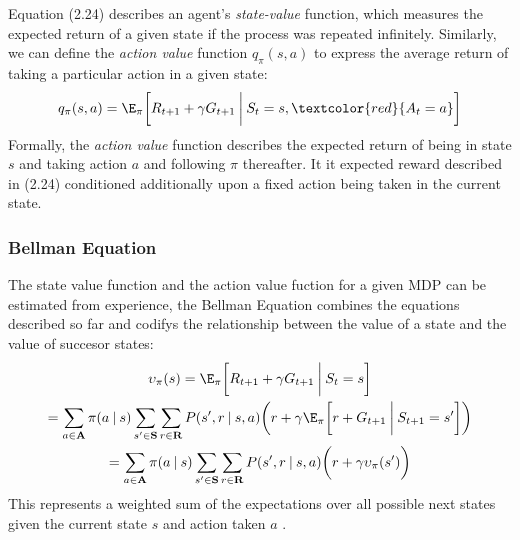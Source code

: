 Equation (2.24) describes an agent's \emph{state-value} function, which measures
the expected return of a given state if the process was repeated infinitely. Similarly,
we can define the \emph{action value} function $q_\pi(s,a)$ to express the average return
of taking a particular action in a given state:
\begin{equation}
    q_\pi(s,a) = \E_\pi \biggl [R_{t+1} + \gamma G_{t+1} \: \biggl | \: S_t = s,\textcolor{red}{ A_t = a} \biggl]
\end{equation}
Formally, the \emph{action value} function describes the expected return of being in state $s$ and taking
action $a$ and following $\pi$ thereafter. It it expected reward described in (2.24) conditioned
additionally upon a fixed action being taken in the current state.
\subsubsection{Bellman Equation}
The state value function and the action value fuction for a given MDP can be estimated from
experience, the Bellman Equation combines the equations described so far and codifys
the relationship between the value of a state and the value of succesor states:
\begin{equation}
    \begin{gathered}
        \upsilon_\pi(s) = \E_\pi \biggl[ R_{t+1} + \gamma G_{t+1}\: \biggl | \: S_t = s  \biggl ] \\
        = \sum_{a \in \mathbf{A}} \pi(a \: | \: s) \sum_{s' \in \mathbf{S}} \sum_{r\in \mathbf{R}}P(s',r \: | \: s,a) \biggl(r + \gamma \E_\pi \biggl [r + G_{t+1} \: \biggl | \: S_{t+1} = s' \biggl] \biggl)\\
        =\sum_{a \in \mathbf{A}} \pi(a \: | \: s) \sum_{s' \in \mathbf{S}} \sum_{r\in \mathbf{R}}P(s',r \: | \: s,a) \biggl(r + \gamma \upsilon_\pi(s') \biggl )
    \end{gathered}
\end{equation}
This represents a weighted sum of the expectations over all possible next states given the current state
$s$ and action taken $a$ \cite{sutton2018reinforcement}.
